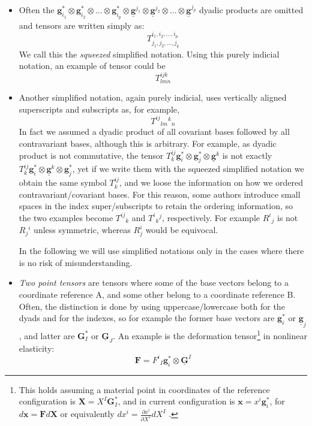 \documentclass{digitaldynamics}
\def\vect#1{\bm{#1}}
\def\vcovar#1{{\bm{#1}}^*}
\def\vcontr#1{\underline{\bm{#1}}}
\def\tensor#1{\bm{#1}}
\begin{document}
\begin{itemize}
	\item Often the $\vcovar{g}_{i_1} \otimes \vcovar{g}_{i_2} \otimes ... \otimes \vcovar{g}_{i_p} \otimes 
	\vcontr{g}^{j_1} \otimes \vcontr{g}^{j_2} \otimes ... \otimes \vcontr{g}^{j_p}$ dyadic products are omitted and tensors are written
	simply as:
	\[
	   T^{i_1, i_2, ..., i_p}_{j_1, j_2, ..., j_q}
	\]
	We call this the \textit{squeezed} simplified notation. Using this purely indicial notation, an example of tensor could be
	\[
	   T^{ijk}_{lmn}
	\]
	
	\item Another simplified notation, again purely indicial, uses vertically aligned superscripts and subscripts as, for example,
	\[
	   T^{ij}{}_{lm}{}^{k}{}_{n}
	\]
	In fact we assumed a dyadic product of all covariant bases followed by all contravariant bases, although
	this is arbitrary. For example, as dyadic product is not commutative,  the tensor $T^{ij}_{k} \vcovar{g}_{i} \otimes \vcovar{g}_{j} \otimes \vcontr{g}^{k}$ is not exactly 
	$T^{ij}_{k} \vcovar{g}_{i} \otimes \vcontr{g}^{k} \otimes \vcovar{g}_{j}$, yet if we write them with the squeezed simplified notation we obtain the same symbol $T^{ij}_{k}$, and we loose the information on how we ordered contravariant/covariant bases. 
	For this reason, some authors introduce small spaces in the index super/subscripts to retain the ordering information, so the two examples
		become $T^{ij}{}_{k}$ and $T^{i}{}_{k}{}^{j}$, respectively. For example $R^i{}_j$ is not $R_j{}^i$ unless symmetric, whereas $R^i_j$ would be equivocal.
		
		In the following we will use simplified notations only in the cases where there is no risk of misunderstanding.
		
		\item
		\textit{Two point tensors} are tensors where some of the base vectors belong to a coordinate reference A, and some other belong to a coordinate reference B. Often, the distinction is done by using uppercase/lowercase both for the dyads and for the indexes, so for example the former base vectors are $\vcovar{g}_i$ or $\vcontr{g}_j$, and latter are $\vcovar{G}_I$ or $\vcontr{G}_J$. An example is the deformation tensor\footnote{This holds assuming a material point in coordinates of the reference configuration is $\vect{X}=X^I \vcovar{G}_I$, and in current configuration is $\vect{x}=x^i \vcovar{g}_i$, for $d\vect{x}=\tensor{F} d\vect{X}$ or equivalently $dx^i = \frac{\partial x^i}{\partial X^I} dX^I$ .} in nonlinear elasticity:
		\[
		\tensor{F} = F^i{}_I \vcovar{g}_{i} \otimes \vcontr{G}^{I}
		\]
		

\end{itemize}
\end{document}
